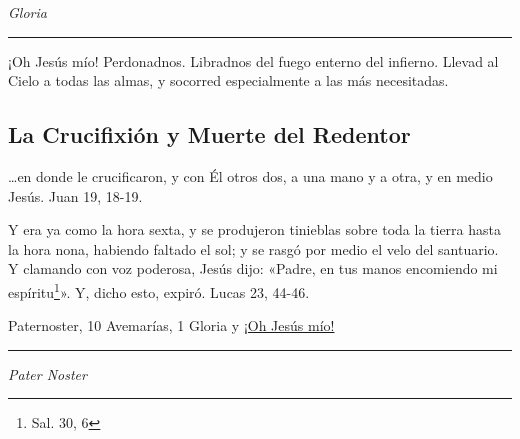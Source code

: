 \documentclass[a4paper,11pt, oneside]{report}
\begin{document}
\indent\textit{Gloria} \par      

\begin{center}\rule{1\linewidth}{\linethickness}\end{center}      

\medskip
\hypertarget{finalCruz}{¡Oh Jesús mío! Perdonadnos. Libradnos del fuego enterno del infierno. Llevad al Cielo a todas las almas, y socorred especialmente a las más 
necesitadas.}
    
  
\subsection*{La Crucifixión y Muerte del Redentor}

{\ldots}en donde le crucificaron, y con Él otros dos, a una mano y a otra, y en medio Jesús. Juan 19, 18-19.

\smallskip
Y era ya como la hora sexta, y se produjeron tinieblas sobre toda la tierra hasta la hora nona, habiendo faltado el sol; y se rasgó por medio 
el velo del santuario. Y clamando con voz poderosa, Jesús dijo: «Padre, en tus manos encomiendo mi espíritu\footnote{Sal. 30, 6}». 
Y, dicho esto, expiró. Lucas 23, 44-46.

 Paternoster, 10 Avemarías, 1 Gloria y \hyperlink{finalMuerte}{¡Oh Jesús mío!}

\begin{center}\rule{1\linewidth}{\linethickness}\end{center}

\medskip
\textit{Pater Noster}
\end{document}

